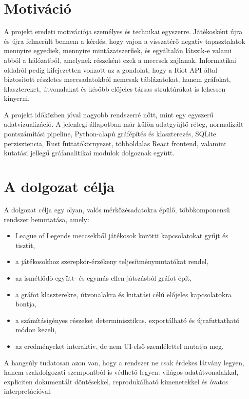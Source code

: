 \documentclass[a4paper,12pt]{report}
\begin{document}
\section{Motiváció}

A projekt eredeti motivációja személyes és technikai egyszerre. Játékosként újra és újra felmerült bennem a kérdés, hogy vajon a visszatérő negatív tapasztalatok mennyire egyediek, mennyire mintázatszerűek, és egyáltalán látszik-e valami abból a hálózatból, amelynek részeként ezek a meccsek zajlanak. Informatikai oldalról pedig kifejezetten vonzott az a gondolat, hogy a Riot API által biztosított részletes meccsadatokból nemcsak táblázatokat, hanem gráfokat, klasztereket, útvonalakat és később előjeles társas struktúrákat is lehessen kinyerni.

A projekt időközben jóval nagyobb rendszerré nőtt, mint egy egyszerű adatvizualizáció. A jelenlegi állapotban már külön adatgyűjtő réteg, normalizált pontszámítási pipeline, Python-alapú gráfépítés és klaszterezés, SQLite perzisztencia, Rust futtatókörnyezet, többoldalas React frontend, valamint kutatási jellegű gráfanalitikai modulok dolgoznak együtt.

\section{A dolgozat célja}

A dolgozat célja egy olyan, valós mérkőzésadatokra épülő, többkomponensű rendszer bemutatása, amely:

\begin{itemize}
    \item League of Legends meccsekből játékosok közötti kapcsolatokat gyűjt és tisztít,
    \item a játékosokhoz szerepkör-érzékeny teljesítménymutatókat rendel,
    \item az ismétlődő együtt- és egymás ellen játszásból gráfot épít,
    \item a gráfot klaszterekre, útvonalakra és kutatási célú előjeles kapcsolatokra bontja,
    \item a számításigényes részeket determinisztikus, exportálható és újrafuttatható módon kezeli,
    \item az eredményeket interaktív, de nem UI-első szemlélettel mutatja meg.
\end{itemize}

A hangsúly tudatosan azon van, hogy a rendszer ne csak érdekes látvány legyen, hanem szakdolgozati szempontból is védhető legyen: világos adatútvonalakkal, expliciten dokumentált döntésekkel, reprodukálható kimenetekkel és óvatos interpretációval.
\end{document}
